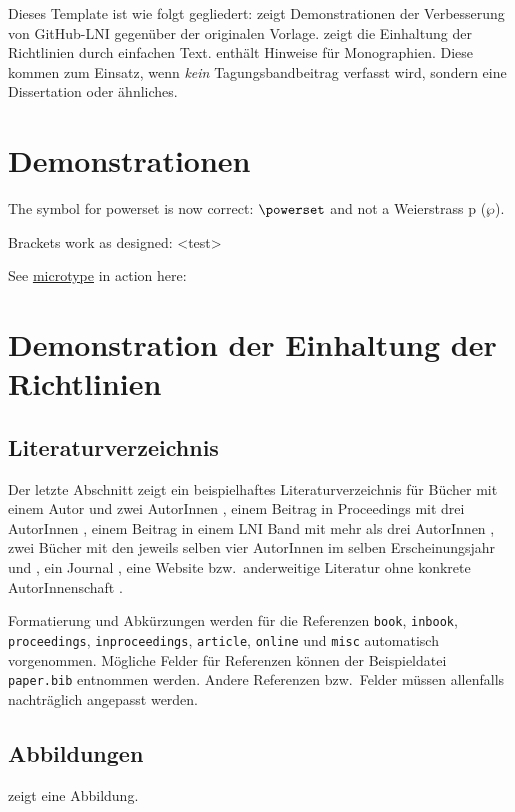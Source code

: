\documentclass{lni}
\begin{document}
Dieses Template ist wie folgt gegliedert:
 zeigt Demonstrationen der Verbesserung von GitHub-LNI gegenüber der originalen Vorlage.
 zeigt die Einhaltung der Richtlinien durch einfachen Text.
 enthält Hinweise für Monographien. Diese kommen zum Einsatz, wenn \emph{kein} Tagungsbandbeitrag verfasst wird, sondern eine Dissertation oder ähnliches.

\section{Demonstrationen}
\label{sec:demos}
The symbol for powerset is now correct: $\powerset$ and not a Weierstrass p ($\wp$).

Brackets work as designed:
<test>

See \href{https://www.ctan.org/pkg/microtype}{microtype} in action here:
\blindtext

\section{Demonstration der Einhaltung der Richtlinien}
\label{sec:lniconformance}

\subsection{Literaturverzeichnis}
Der letzte Abschnitt zeigt ein beispielhaftes Literaturverzeichnis für Bücher mit einem Autor \cite{Ez10} und zwei AutorInnen \cite{AB00}, einem Beitrag in Proceedings mit drei AutorInnen \cite{ABC01}, einem Beitrag in einem LNI Band mit mehr als drei AutorInnen \cite{Az09}, zwei Bücher mit den jeweils selben vier AutorInnen im selben Erscheinungsjahr \cite{Wa14} und \cite{Wa14b}, ein Journal \cite{Gl06}, eine Website \cite{GI14} bzw.\ anderweitige Literatur ohne konkrete AutorInnenschaft \cite{XX14}.

Formatierung und Abkürzungen werden für die Referenzen \texttt{book}, \texttt{inbook}, \texttt{proceedings}, \texttt{inproceedings}, \texttt{article}, \texttt{online} und \texttt{misc} automatisch vorgenommen.
Mögliche Felder für Referenzen können der Beispieldatei \texttt{paper.bib} entnommen werden.
Andere Referenzen bzw.\ Felder müssen allenfalls nachträglich angepasst werden.

\subsection{Abbildungen}
 zeigt eine Abbildung.
\end{document}
